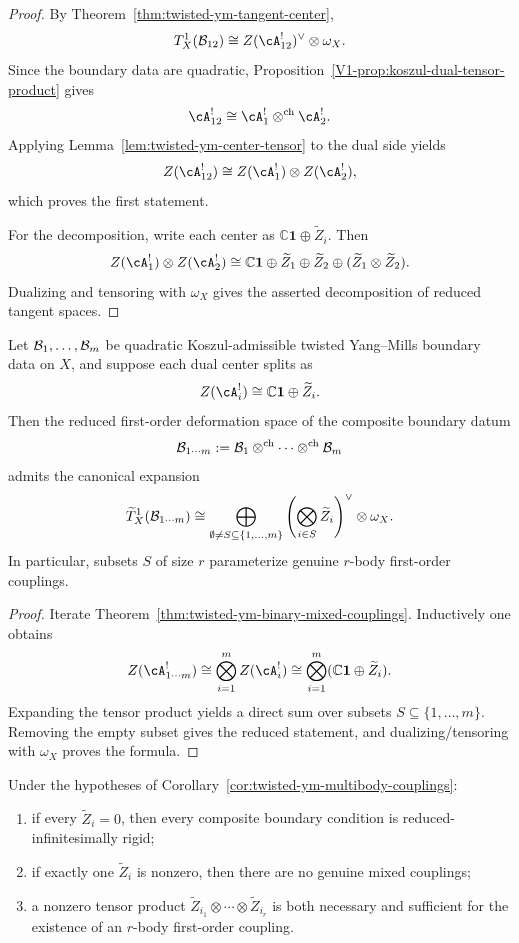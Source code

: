 \begin{proof}
By Theorem~\ref{thm:twisted-ym-tangent-center},
\[
T^1_X(\cB_{12})
\cong
Z(\cA_{12}^{!})^{\vee}\otimes \omega_X.
\]
Since the boundary data are quadratic, Proposition~\ref*{V1-prop:koszul-dual-tensor-product} gives
\[
\cA_{12}^{!}
\cong
\cA_1^{!}\otimes^{\mathrm{ch}}\cA_2^{!}.
\]
Applying Lemma~\ref{lem:twisted-ym-center-tensor} to the dual side yields
\[
Z(\cA_{12}^{!})
\cong
Z(\cA_1^{!})\otimes Z(\cA_2^{!}),
\]
which proves the first statement.

For the decomposition, write each center as $\mathbb{C}\mathbf{1}\oplus \widetilde Z_i$. Then
\[
Z(\cA_1^{!})\otimes Z(\cA_2^{!})
\cong
\mathbb{C}\mathbf{1}
\oplus
\widetilde Z_1
\oplus
\widetilde Z_2
\oplus
(\widetilde Z_1\otimes \widetilde Z_2).
\]
Dualizing and tensoring with $\omega_X$ gives the asserted decomposition of reduced tangent spaces.
\end{proof}

\begin{corollary}
Let $\mathcal{B}_1,\dots,\mathcal{B}_m$ be quadratic Koszul-admissible twisted Yang--Mills boundary data on $X$, and suppose each dual center splits as
\[
Z(\cA_i^{!}) \cong \mathbb{C}\mathbf{1}\oplus \widetilde Z_i.
\]
Then the reduced first-order deformation space of the composite boundary datum
\[
\mathcal{B}_{1\cdots m}
:=
\mathcal{B}_1\otimes^{\mathrm{ch}}\cdots\otimes^{\mathrm{ch}}\mathcal{B}_m
\]
admits the canonical expansion
\[
\widetilde T^1_X(\mathcal{B}_{1\cdots m})
\cong
\bigoplus_{\emptyset \neq S \subseteq \{1,\dots,m\}}
\left(\bigotimes_{i\in S} \widetilde Z_i\right)^{\vee}\otimes \omega_X.
\]
In particular, subsets $S$ of size $r$ parameterize genuine $r$-body first-order couplings.
\end{corollary}

\begin{proof}
Iterate Theorem~\ref{thm:twisted-ym-binary-mixed-couplings}. Inductively one obtains
\[
Z(\cA_{1\cdots m}^{!})
\cong
\bigotimes_{i=1}^m Z(\cA_i^{!})
\cong
\bigotimes_{i=1}^m (\mathbb{C}\mathbf{1}\oplus \widetilde Z_i).
\]
Expanding the tensor product yields a direct sum over subsets $S\subseteq \{1,\dots,m\}$. Removing the empty subset gives the reduced statement, and dualizing/tensoring with $\omega_X$ proves the formula.
\end{proof}

\begin{corollary}
Under the hypotheses of Corollary~\ref{cor:twisted-ym-multibody-couplings}:
\begin{enumerate}[label=(\roman*)]
\item if every $\widetilde Z_i=0$, then every composite boundary condition is reduced-infinitesimally rigid;
\item if exactly one $\widetilde Z_i$ is nonzero, then there are no genuine mixed couplings;
\item a nonzero tensor product $\widetilde Z_{i_1}\otimes\cdots\otimes\widetilde Z_{i_r}$ is both necessary and sufficient for the existence of an $r$-body first-order coupling.
\end{enumerate}
\end{corollary}


